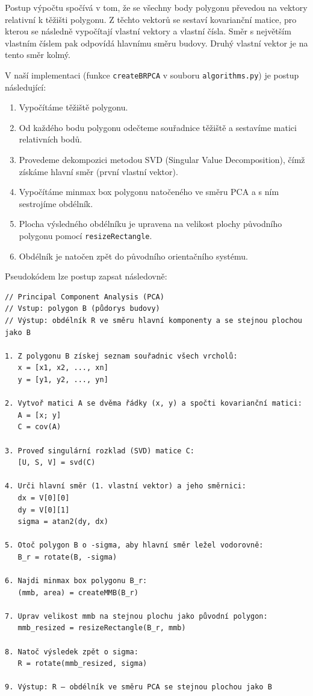 \documentclass[a4paper,12pt]{article}
\begin{document}
Postup výpočtu spočívá v tom, že se všechny body polygonu převedou na vektory relativní k těžišti polygonu. Z těchto vektorů se sestaví kovarianční matice, pro kterou se následně vypočítají vlastní vektory a vlastní čísla. Směr s největším vlastním číslem pak odpovídá hlavnímu směru budovy. Druhý vlastní vektor je na tento směr kolmý.

V naší implementaci (funkce \texttt{createBRPCA} v souboru \texttt{algorithms.py}) je postup následující:
\begin{enumerate}
    \item Vypočítáme těžiště polygonu.
    \item Od každého bodu polygonu odečteme souřadnice těžiště a sestavíme matici relativních bodů.
    \item Provedeme dekompozici metodou SVD (Singular Value Decomposition), čímž získáme hlavní směr (první vlastní vektor).
    \item Vypočítáme minmax box polygonu natočeného ve směru PCA a s ním sestrojíme obdélník.
    \item Plocha výsledného obdélníku je upravena na velikost plochy původního polygonu pomocí \texttt{resizeRectangle}.
    \item Obdélník je natočen zpět do původního orientačního systému.
\end{enumerate}

Pseudokódem lze postup zapsat následovně:

\begin{verbatim}
// Principal Component Analysis (PCA)
// Vstup: polygon B (půdorys budovy)
// Výstup: obdélník R ve směru hlavní komponenty a se stejnou plochou jako B

1. Z polygonu B získej seznam souřadnic všech vrcholů:
   x = [x1, x2, ..., xn]
   y = [y1, y2, ..., yn]

2. Vytvoř matici A se dvěma řádky (x, y) a spočti kovarianční matici:
   A = [x; y]
   C = cov(A)

3. Proveď singulární rozklad (SVD) matice C:
   [U, S, V] = svd(C)

4. Urči hlavní směr (1. vlastní vektor) a jeho směrnici:
   dx = V[0][0]
   dy = V[0][1]
   sigma = atan2(dy, dx)

5. Otoč polygon B o -sigma, aby hlavní směr ležel vodorovně:
   B_r = rotate(B, -sigma)

6. Najdi minmax box polygonu B_r:
   (mmb, area) = createMMB(B_r)

7. Uprav velikost mmb na stejnou plochu jako původní polygon:
   mmb_resized = resizeRectangle(B_r, mmb)

8. Natoč výsledek zpět o sigma:
   R = rotate(mmb_resized, sigma)

9. Výstup: R – obdélník ve směru PCA se stejnou plochou jako B
\end{verbatim}
\end{document}

